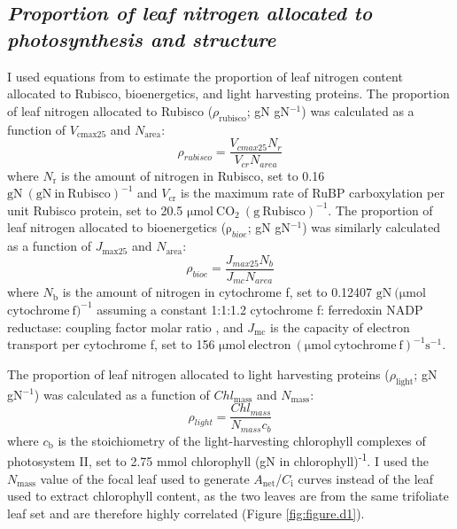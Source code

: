 \subsection{\textit{Proportion of leaf nitrogen allocated to photosynthesis and structure}}
\noindent I used equations from  to estimate the proportion of leaf nitrogen content allocated to Rubisco, bioenergetics, and light harvesting proteins. The proportion of leaf nitrogen allocated to Rubisco ($\rho_\mathrm{rubisco}$; gN gN$^{-1}$) was calculated as a function of $V_\mathrm{cmax25}$ and $N_\mathrm{area}$: 
\begin{equation} \label{eqn_5.6}
    \rho_{rubisco}=\frac{V_{cmax25}N_r}{V_{cr}N_{area}}
\end{equation}
\noindent where $N_\mathrm{r}$ is the amount of nitrogen in Rubisco, set to 0.16 $\mathrm{gN\ (gN\ in\ Rubisco)^{-1}}$ and $V_\mathrm{cr}$ is the maximum rate of RuBP carboxylation per unit Rubisco protein, set to 20.5 $\mathrm{\mu mol\ CO_2\ (g\ Rubisco)^{-1}}$. The proportion of leaf nitrogen allocated to bioenergetics ($\mathrm\rho_{bioe}$; gN gN$^{-1}$) was similarly calculated as a function of $J_\mathrm{max25}$ and $N_\mathrm{area}$:
\begin{equation} \label{eqn_5.7}
    \rho_{bioe}=\frac{J_{max25}N_b}{J_{mc}N_{area}}
\end{equation}
\noindent where $N_\mathrm{b}$ is the amount of nitrogen in cytochrome f, set to 0.12407 $\mathrm{gN\ (\mu mol}$ $\mathrm{cytochrome\ f)^{-1}}$ assuming a constant 1:1:1.2 cytochrome f: ferredoxin NADP reductase: coupling factor molar ratio , and $J_\mathrm{mc}$ is the capacity of electron transport per cytochrome f, set to 156 $\mathrm{\mu mol\ electron\ (\mu mol\ cytochrome\ f)^{-1} s^{-1}}$.

The proportion of leaf nitrogen allocated to light harvesting proteins ($\rho_\mathrm{light}$; gN gN$^{-1}$) was calculated as a function of $Chl_\mathrm{mass}$ and $N_\mathrm{mass}$:
\begin{equation} \label{eqn_5.8}
    \rho_{light}=\frac{Chl_{mass}}{N_{mass}c_{b}}
\end{equation}
\noindent where $c_\mathrm{b}$ is the stoichiometry of the light-harvesting chlorophyll complexes of photosystem II, set to 2.75 $\mathrm{mmol}$ chlorophyll (gN in chlorophyll)\textsuperscript{-1}. I used the $N_\mathrm{mass}$ value of the focal leaf used to generate $A_\mathrm{net}$/$C_\mathrm{i}$ curves instead of the leaf used to extract chlorophyll content, as the two leaves are from the same trifoliate leaf set and are therefore highly correlated (Figure \ref{fig:figure.d1}).

